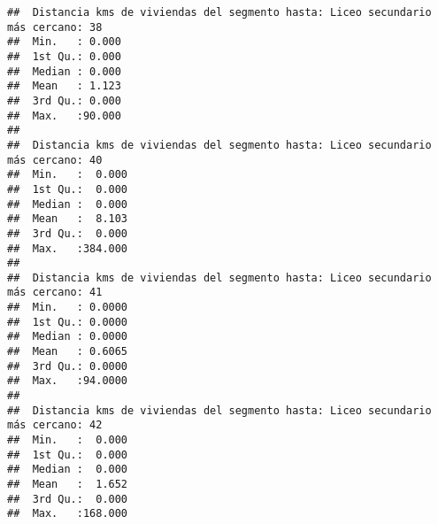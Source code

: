 \documentclass[11pt,]{article}
\begin{document}
\begin{verbatim}
##  Distancia kms de viviendas del segmento hasta: Liceo secundario más cercano: 38
##  Min.   : 0.000                                                                 
##  1st Qu.: 0.000                                                                 
##  Median : 0.000                                                                 
##  Mean   : 1.123                                                                 
##  3rd Qu.: 0.000                                                                 
##  Max.   :90.000                                                                 
##                                                                                 
##  Distancia kms de viviendas del segmento hasta: Liceo secundario más cercano: 40
##  Min.   :  0.000                                                                
##  1st Qu.:  0.000                                                                
##  Median :  0.000                                                                
##  Mean   :  8.103                                                                
##  3rd Qu.:  0.000                                                                
##  Max.   :384.000                                                                
##                                                                                 
##  Distancia kms de viviendas del segmento hasta: Liceo secundario más cercano: 41
##  Min.   : 0.0000                                                                
##  1st Qu.: 0.0000                                                                
##  Median : 0.0000                                                                
##  Mean   : 0.6065                                                                
##  3rd Qu.: 0.0000                                                                
##  Max.   :94.0000                                                                
##                                                                                 
##  Distancia kms de viviendas del segmento hasta: Liceo secundario más cercano: 42
##  Min.   :  0.000                                                                
##  1st Qu.:  0.000                                                                
##  Median :  0.000                                                                
##  Mean   :  1.652                                                                
##  3rd Qu.:  0.000                                                                
##  Max.   :168.000                                                                

\end{verbatim}
\end{document}
